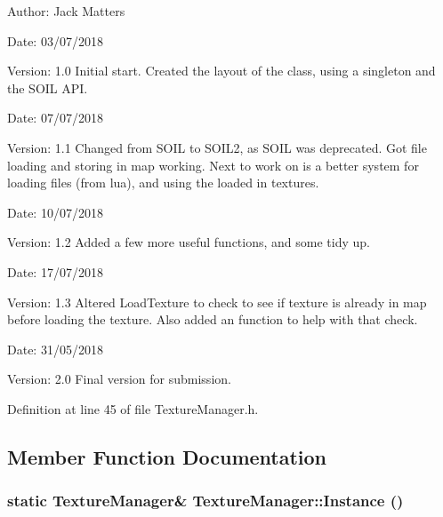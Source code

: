 \begin{Desc}
\item[Author:]Jack Matters\end{Desc}
\begin{Desc}
\item[Date:]03/07/2018 \end{Desc}
\begin{Desc}
\item[Version:]1.0 Initial start. Created the layout of the class, using a singleton and the SOIL API.\end{Desc}
\begin{Desc}
\item[Date:]07/07/2018 \end{Desc}
\begin{Desc}
\item[Version:]1.1 Changed from SOIL to SOIL2, as SOIL was deprecated. Got file loading and storing in map working. Next to work on is a better system for loading files (from lua), and using the loaded in textures.\end{Desc}
\begin{Desc}
\item[Date:]10/07/2018 \end{Desc}
\begin{Desc}
\item[Version:]1.2 Added a few more useful functions, and some tidy up.\end{Desc}
\begin{Desc}
\item[Date:]17/07/2018 \end{Desc}
\begin{Desc}
\item[Version:]1.3 Altered LoadTexture to check to see if texture is already in map before loading the texture. Also added an function to help with that check.\end{Desc}
\begin{Desc}
\item[Date:]31/05/2018 \end{Desc}
\begin{Desc}
\item[Version:]2.0 Final version for submission. \end{Desc}


Definition at line 45 of file TextureManager.h.

\subsection{Member Function Documentation}
\hypertarget{class_texture_manager_81a2f2ac1876be84e0a0a472199679d5}{
\subsubsection[Instance]{\setlength{\rightskip}{0pt plus 5cm}static {\bf TextureManager}\& TextureManager::Instance ()}}
\label{class_texture_manager_81a2f2ac1876be84e0a0a472199679d5}


